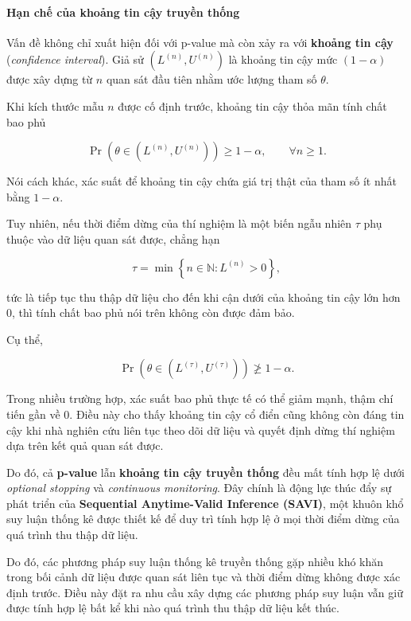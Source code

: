 \paragraph{Hạn chế của khoảng tin cậy truyền thống}

Vấn đề không chỉ xuất hiện đối với p-value mà còn xảy ra với
\textbf{khoảng tin cậy} (\textit{confidence interval}).
Giả sử $(L^{(n)},U^{(n)})$ là khoảng tin cậy mức $(1-\alpha)$
được xây dựng từ $n$ quan sát đầu tiên nhằm ước lượng tham số $\theta$.

Khi kích thước mẫu $n$ được cố định trước, khoảng tin cậy thỏa mãn tính chất bao phủ

\[
\Pr\!\left(
\theta \in \left(L^{(n)},U^{(n)}\right)
\right)
\geq 1-\alpha,
\qquad \forall n\geq 1.
\]

Nói cách khác, xác suất để khoảng tin cậy chứa giá trị thật của tham số
ít nhất bằng $1-\alpha$.

Tuy nhiên, nếu thời điểm dừng của thí nghiệm là một biến ngẫu nhiên $\tau$
phụ thuộc vào dữ liệu quan sát được, chẳng hạn

\[
\tau
=
\min
\left\{
n\in\mathbb{N}:L^{(n)}>0
\right\},
\]

tức là tiếp tục thu thập dữ liệu cho đến khi cận dưới của khoảng tin cậy
lớn hơn 0, thì tính chất bao phủ nói trên không còn được đảm bảo.

Cụ thể,

\[
\Pr\!\left(
\theta \in \left(L^{(\tau)},U^{(\tau)}\right)
\right)
\ngeq 1-\alpha.
\]

Trong nhiều trường hợp, xác suất bao phủ thực tế có thể giảm mạnh,
thậm chí tiến gần về 0. Điều này cho thấy khoảng tin cậy cổ điển cũng
không còn đáng tin cậy khi nhà nghiên cứu liên tục theo dõi dữ liệu và
quyết định dừng thí nghiệm dựa trên kết quả quan sát được.

Do đó, cả \textbf{p-value} lẫn \textbf{khoảng tin cậy truyền thống}
đều mất tính hợp lệ dưới \textit{optional stopping} và
\textit{continuous monitoring}. Đây chính là động lực thúc đẩy sự phát triển của
\textbf{Sequential Anytime-Valid Inference (SAVI)},
một khuôn khổ suy luận thống kê được thiết kế để duy trì tính hợp lệ
ở mọi thời điểm dừng của quá trình thu thập dữ liệu.

Do đó, các phương pháp suy luận thống kê truyền thống gặp nhiều khó khăn trong bối cảnh dữ liệu được quan sát liên tục và thời điểm dừng không được xác định trước. Điều này đặt ra nhu cầu xây dựng các phương pháp suy luận vẫn giữ được tính hợp lệ bất kể khi nào quá trình thu thập dữ liệu kết thúc.

